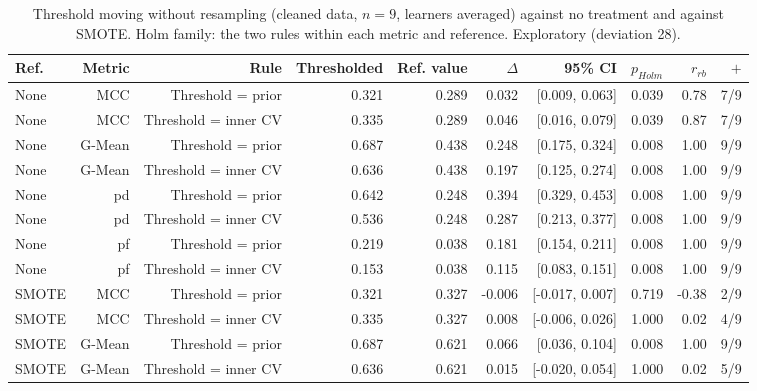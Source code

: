 \begin{table}[t]
\centering
\footnotesize
\caption{Threshold moving without resampling (cleaned data, $n=9$, learners averaged) against no treatment and against SMOTE. Holm family: the two rules within each metric and reference. Exploratory (deviation 28).}
\label{tab:thr}
\begin{adjustbox}{max width=\linewidth}
\begin{tabular}{lrrrrrrrrr}
\toprule
Ref. & Metric & Rule & Thresholded & Ref. value & $\Delta$ & 95\% CI & $p_{Holm}$ & $r_{rb}$ & $+$ \\
\midrule
None & MCC & Threshold = prior & 0.321 & 0.289 & 0.032 & [0.009, 0.063] & 0.039 & 0.78 & 7/9 \\
None & MCC & Threshold = inner CV & 0.335 & 0.289 & 0.046 & [0.016, 0.079] & 0.039 & 0.87 & 7/9 \\
None & G-Mean & Threshold = prior & 0.687 & 0.438 & 0.248 & [0.175, 0.324] & 0.008 & 1.00 & 9/9 \\
None & G-Mean & Threshold = inner CV & 0.636 & 0.438 & 0.197 & [0.125, 0.274] & 0.008 & 1.00 & 9/9 \\
None & pd & Threshold = prior & 0.642 & 0.248 & 0.394 & [0.329, 0.453] & 0.008 & 1.00 & 9/9 \\
None & pd & Threshold = inner CV & 0.536 & 0.248 & 0.287 & [0.213, 0.377] & 0.008 & 1.00 & 9/9 \\
None & pf & Threshold = prior & 0.219 & 0.038 & 0.181 & [0.154, 0.211] & 0.008 & 1.00 & 9/9 \\
None & pf & Threshold = inner CV & 0.153 & 0.038 & 0.115 & [0.083, 0.151] & 0.008 & 1.00 & 9/9 \\
SMOTE & MCC & Threshold = prior & 0.321 & 0.327 & -0.006 & [-0.017, 0.007] & 0.719 & -0.38 & 2/9 \\
SMOTE & MCC & Threshold = inner CV & 0.335 & 0.327 & 0.008 & [-0.006, 0.026] & 1.000 & 0.02 & 4/9 \\
SMOTE & G-Mean & Threshold = prior & 0.687 & 0.621 & 0.066 & [0.036, 0.104] & 0.008 & 1.00 & 9/9 \\
SMOTE & G-Mean & Threshold = inner CV & 0.636 & 0.621 & 0.015 & [-0.020, 0.054] & 1.000 & 0.02 & 5/9 \\
\bottomrule
\end{tabular}
\end{adjustbox}
\end{table}
